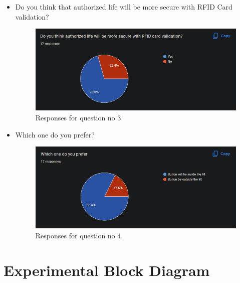 \documentclass{lxaiproposal}
\begin{document}
\begin{itemize}
          \newpage %

    \item Do you think that authorized life will be more secure with RFID Card validation?
          \begin{figure} [h!]
              \centering
              \includegraphics[width=1\linewidth]{images/Q3.png}
              \caption{Responses for question no 3}
              \label{fig:my-fig}
          \end{figure}
    \item Which one do you prefer?
          \begin{figure} [h!]
              \centering
              \includegraphics[width=1\linewidth]{images/Q4.png}
              \caption{Responses for question no 4}
              \label{fig:my-fig}
          \end{figure}
\end{itemize}


\section{Experimental Block Diagram}
\vspace*{-3mm}
\end{document}
